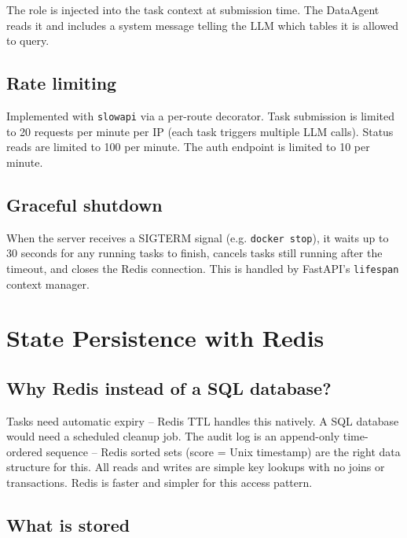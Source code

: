 \documentclass[12pt,a4paper]{article}
\begin{document}
The role is injected into the task context at submission time. The DataAgent reads it and includes a system message telling the LLM which tables it is allowed to query.

\subsection{Rate limiting}

Implemented with \texttt{slowapi} via a per-route decorator. Task submission is limited to 20 requests per minute per IP (each task triggers multiple LLM calls). Status reads are limited to 100 per minute. The auth endpoint is limited to 10 per minute.

\subsection{Graceful shutdown}

When the server receives a SIGTERM signal (e.g. \texttt{docker stop}), it waits up to 30 seconds for any running tasks to finish, cancels tasks still running after the timeout, and closes the Redis connection. This is handled by FastAPI's \texttt{lifespan} context manager.


\section{State Persistence with Redis}

\subsection{Why Redis instead of a SQL database?}

Tasks need automatic expiry -- Redis TTL handles this natively. A SQL database would need a scheduled cleanup job. The audit log is an append-only time-ordered sequence -- Redis sorted sets (score = Unix timestamp) are the right data structure for this. All reads and writes are simple key lookups with no joins or transactions. Redis is faster and simpler for this access pattern.

\subsection{What is stored}
\end{document}

